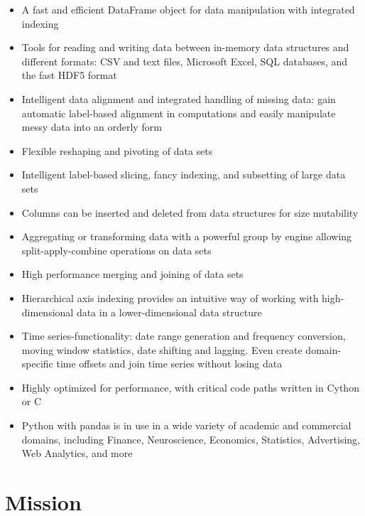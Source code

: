 \documentclass[a4paper, 11pt]{article}
\begin{document}
\begin{itemize}
\item A fast and efficient DataFrame object for data manipulation with integrated indexing

\item Tools for reading and writing data between in-memory data structures and different formats: CSV and text files, Microsoft Excel, SQL databases, and the fast HDF5 format

\item Intelligent data alignment and integrated handling of missing data: gain automatic label-based alignment in computations and easily manipulate messy data into an orderly form

\item Flexible reshaping and pivoting of data sets

\item Intelligent label-based slicing, fancy indexing, and subsetting of large data sets

\item Columns can be inserted and deleted from data structures for size mutability

\item Aggregating or transforming data with a powerful group by engine allowing split-apply-combine operations on data sets

\item High performance merging and joining of data sets

\item Hierarchical axis indexing provides an intuitive way of working with high-dimensional data in a lower-dimensional data structure

\item Time series-functionality: date range generation and frequency conversion, moving window statistics, date shifting and lagging. Even create domain-specific time offsets and join time series without losing data

\item Highly optimized for performance, with critical code paths written in Cython or C

\item Python with pandas is in use in a wide variety of academic and commercial domains, including Finance, Neuroscience, Economics, Statistics, Advertising, Web Analytics, and more
\end{itemize}

\section{Mission}
\end{document}
